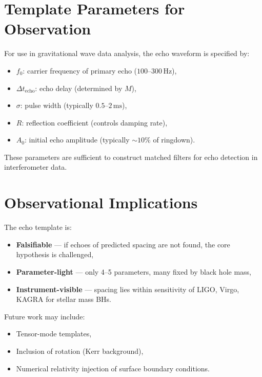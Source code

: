 \documentclass[a4paper, 12pt, oneside]{book}
\numberwithin{equation}{chapter}
\begin{document}
\section{Template Parameters for Observation}
\label{sec:Templates}

For use in gravitational wave data analysis, the echo waveform is specified by:

\begin{itemize}
  \item \( f_0 \): carrier frequency of primary echo (\( 100 \text{–} 300\,\mathrm{Hz} \)),
  \item \( \Delta t_{\text{echo}} \): echo delay (determined by \( M \)),
  \item \( \sigma \): pulse width (typically \( 0.5\text{–}2\,\mathrm{ms} \)),
  \item \( R \): reflection coefficient (controls damping rate),
  \item \( A_0 \): initial echo amplitude (typically \( \sim10\% \) of ringdown).
\end{itemize}

These parameters are sufficient to construct matched filters for echo detection in interferometer data.

\section{Observational Implications}
\label{sec:ObservationalUse}

The echo template is:
\begin{itemize}
  \item \textbf{Falsifiable} — if echoes of predicted spacing are not found, the core hypothesis is challenged,
  \item \textbf{Parameter-light} — only 4–5 parameters, many fixed by black hole mass,
  \item \textbf{Instrument-visible} — spacing lies within sensitivity of LIGO, Virgo, KAGRA for stellar mass BHs.
\end{itemize}

Future work may include:

\begin{itemize}
  \item Tensor-mode templates,
  \item Inclusion of rotation (Kerr background),
  \item Numerical relativity injection of surface boundary conditions.
\end{itemize}
\end{document}
